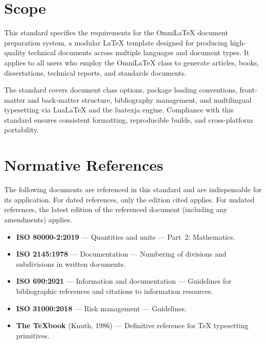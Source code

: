 \documentclass[
    language=english,
    doctype=standard,
    institution=none,
    titlestyle=book,
    oneside,
]{../../omnilatex}
\begin{document}
\maketitle

\tableofcontents

\section{Scope}

This standard specifies the requirements for the OmniLaTeX document preparation system, a modular \LaTeX{} template designed for producing high-quality technical documents across multiple languages and document types. It applies to all users who employ the OmniLaTeX class to generate articles, books, dissertations, technical reports, and standards documents.

The standard covers document class options, package loading conventions, front-matter and back-matter structure, bibliography management, and multilingual typesetting via LuaLaTeX and the luatexja engine. Compliance with this standard ensures consistent formatting, reproducible builds, and cross-platform portability.

\section{Normative References}

The following documents are referenced in this standard and are indispensable for its application. For dated references, only the edition cited applies. For undated references, the latest edition of the referenced document (including any amendments) applies.

\begin{itemize}
    \item \textbf{ISO 80000-2:2019} --- Quantities and units --- Part~2: Mathematics.
    \item \textbf{ISO 2145:1978} --- Documentation --- Numbering of divisions and subdivisions in written documents.
    \item \textbf{ISO 690:2021} --- Information and documentation --- Guidelines for bibliographic references and citations to information resources.
    \item \textbf{ISO 31000:2018} --- Risk management --- Guidelines.
    \item \textbf{The \TeX{}book} (Knuth, 1986) --- Definitive reference for \TeX{} typesetting primitives.
\end{itemize}
\end{document}
